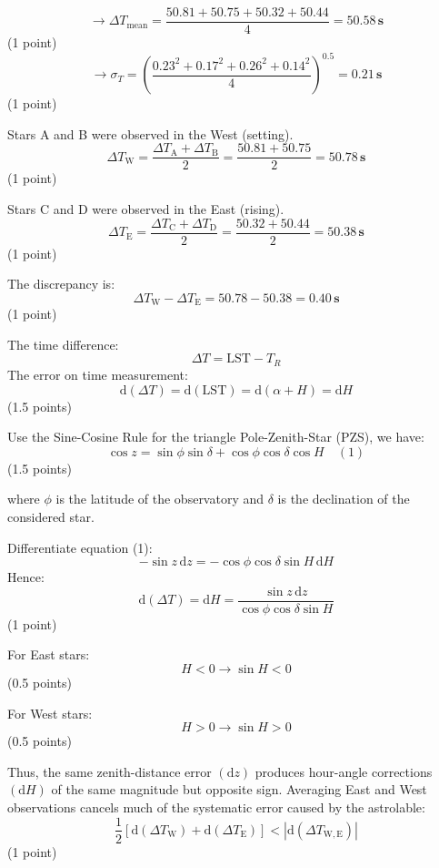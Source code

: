 \begin{description}
  \[
  \rightarrow \Delta T_{\mathrm{mean}}
  = \frac{50.81 + 50.75 + 50.32 + 50.44}{4} = \mathbf{50.58\,s}
  \]
  \hfill(1 point)
  \[
  \rightarrow \sigma_T
  = \left(\frac{0.23^2 + 0.17^2 + 0.26^2 + 0.14^2}{4}\right)^{0.5}
  = \mathbf{0.21\,s}
  \]
  \hfill(1 point)

\item[(b)] Stars A and B were observed in the West (setting).
  \[
  \Delta T_{\mathrm{W}}
  = \frac{\Delta T_{\mathrm{A}} + \Delta T_{\mathrm{B}}}{2}
  = \frac{50.81 + 50.75}{2} = \mathbf{50.78\,s}
  \]
  \hfill(1 point)

  Stars C and D were observed in the East (rising).
  \[
  \Delta T_{\mathrm{E}}
  = \frac{\Delta T_{\mathrm{C}} + \Delta T_{\mathrm{D}}}{2}
  = \frac{50.32 + 50.44}{2} = \mathbf{50.38\,s}
  \]
  \hfill(1 point)

  The discrepancy is:
  \[
  \Delta T_{\mathrm{W}} - \Delta T_{\mathrm{E}} = 50.78 - 50.38
  = \mathbf{0.40\,s}
  \]
  \hfill(1 point)

\item[(c)] The time difference:
  \[ \Delta T = \mathrm{LST} - T_R \]
  The error on time measurement:
  \[
  \mathrm{d}(\Delta T) = \mathrm{d}(\mathrm{LST}) = \mathrm{d}(\alpha + H)
  = \mathrm{d}H
  \]
  \hfill(1.5 points)

  Use the Sine-Cosine Rule for the triangle Pole-Zenith-Star (PZS), we have:
  \[
  \cos z = \sin\phi \sin\delta + \cos\phi \cos\delta \cos H \quad (1)
  \]
  \hfill(1.5 points)

  where $\phi$ is the latitude of the observatory and $\delta$ is the
  declination of the considered star.

  Differentiate equation (1):
  \[
  -\sin z\,\mathrm{d}z = -\cos\phi \cos\delta \sin H\,\mathrm{d}H
  \]
  Hence:
  \[
  \mathrm{d}(\Delta T) = \mathrm{d}H
  = \frac{\sin z\,\mathrm{d}z}{\cos\phi \cos\delta \sin H}
  \]
  \hfill(1 point)

  For East stars:
  \[ H < 0 \rightarrow \sin H < 0 \]
  \hfill(0.5 points)

  For West stars:
  \[ H > 0 \rightarrow \sin H > 0 \]
  \hfill(0.5 points)

  Thus, the same zenith-distance error $(\mathrm{d}z)$ produces hour-angle
  corrections $(\mathrm{d}H)$ of the same magnitude but opposite sign.
  Averaging East and West observations cancels much of the systematic error
  caused by the astrolable:
  \[
  \frac{1}{2}\left[\mathrm{d}(\Delta T_{\mathrm{W}})
    + \mathrm{d}(\Delta T_{\mathrm{E}})\right]
  < \left|\mathrm{d}(\Delta T_{\mathrm{W,E}})\right|
  \]
  \hfill(1 point)
\end{description}

